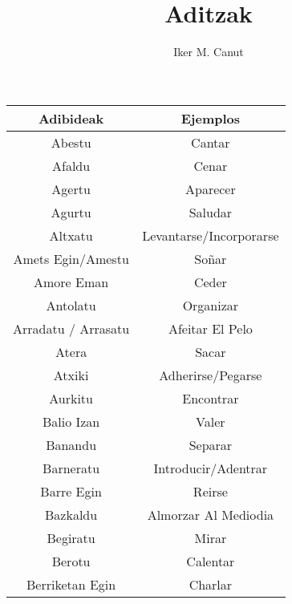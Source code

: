 \documentclass[11pt, a4paper]{article}
\begin{document}
\author{Iker M. Canut}
\date{}
\title{Aditzak\\}
\maketitle


\newpage

\centering
\begin{longtable}{cc} 
\hline
 \textbf{Adibideak}        & \textbf{Ejemplos}           \\ 
\hline
Abestu                     & Cantar                      \\ 
\hline
Afaldu                     & Cenar                       \\ 
\hline
Agertu                     & Aparecer                    \\ 
\hline
Agurtu                     & Saludar                     \\ 
\hline
Altxatu                    & Levantarse/Incorporarse     \\ 
\hline
Amets Egin/Amestu          & Soñar                       \\ 
\hline
Amore Eman                 & Ceder                       \\ 
\hline
Antolatu                   & Organizar                   \\ 
\hline
Arradatu / Arrasatu        & Afeitar El Pelo             \\ 
\hline
Atera                      & Sacar                       \\ 
\hline
Atxiki                     & Adherirse/Pegarse           \\ 
\hline
Aurkitu                    & Encontrar                   \\ 
\hline
Balio Izan                 & Valer                       \\ 
\hline
Banandu                    & Separar                     \\ 
\hline
Barneratu                  & Introducir/Adentrar         \\ 
\hline
Barre Egin                 & Reirse                      \\ 
\hline
Bazkaldu                   & Almorzar Al Mediodia        \\ 
\hline
Begiratu                   & Mirar                       \\ 
\hline
Berotu                     & Calentar                    \\ 
\hline
Berriketan Egin            & Charlar                     \\ 

\end{longtable}
\end{document}
